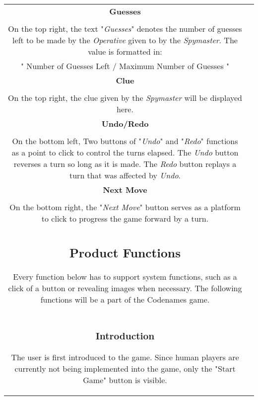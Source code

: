 \documentclass[10pt, a4paper]{article}
\begin{document}
\begin{table}[htbp]
\begin{center}
\begin{tabular}{| c | c |}
	   \textbf{Guesses}\\
	   \\
	    On the top right, the text "\textit{Guesses}" denotes the number of guesses left to be made by the \textit{Operative} given to by the \textit{Spymaster}. The value is formatted in: \\
	    
	   " Number of Guesses Left / Maximum Number of Guesses "\\
	   
	   \textbf{Clue}\\
	   \\
	   On the top right, the clue given by the \textit{Spymaster} will be displayed here.\\
	   
	   \textbf{Undo/Redo}\\
	   \\
	   On the bottom left, Two buttons of "\textit{Undo}" and "\textit{Redo}" functions as a point to click to control the turns elapsed. The \textit{Undo} button reverses a turn so long as it is made. The \textit{Redo} button replays a turn that was affected by \textit{Undo}.\\
	   
	   \textbf{Next Move}\\
	   \\
	   On the bottom right, the "\textit{Next Move}" button serves as a platform to click to progress the game forward by a turn.\\
	   
	   \clearpage
			
	\subsection{Product Functions}
	
	Every function below has to support system  functions, such as a click of a button or revealing images when necessary. The following functions will be a part of the Codenames game.\\
	
		\subsubsection{Introduction}
		
		The user is first introduced to the game. Since human players are currently not being implemented into the game, only the "Start Game" button is visible. \\
		

\end{tabular}
\end{center}
\end{table}
\end{document}
